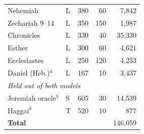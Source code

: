 \begin{table}[!ht]
\begin{tabular}{llrrr}
Nehemiah              & L & 380 & 60 & 7{,}842 \\
Zechariah 9--14       & L & 350 & 150 & 1{,}987 \\
Chronicles            & L & 330 & 40 & 35{,}330 \\
Esther                & L & 300 & 60 & 4{,}621 \\
Ecclesiastes          & L & 250 & 120 & 4{,}233 \\
Daniel (Heb.)$^a$     & L & 167 & 10 & 3{,}437 \\
\hline
\multicolumn{5}{l}{\textit{Held out of both models}} \\
Jeremiah oracle$^b$   & S & 605 & 30 & 14{,}539 \\
Haggai$^b$            & T & 520 & 10 & 877 \\
\hline
\multicolumn{4}{l}{\textbf{Total}} & 146{,}059 \\
\hline
\end{tabular}
\label{tab:corpus}
\end{table}
